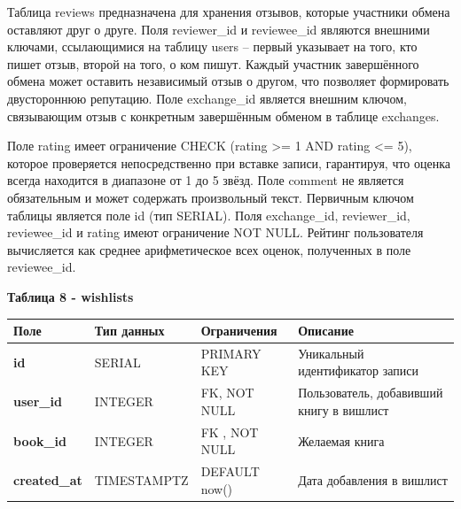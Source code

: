 \documentclass[14pt,a4paper]{extarticle}
\begin{document}
Таблица reviews предназначена для хранения отзывов, которые участники
обмена оставляют друг о друге. Поля reviewer\_id и reviewee\_id являются
внешними ключами, ссылающимися на таблицу users -- первый указывает на
того, кто пишет отзыв, второй на того, о ком пишут. Каждый участник
завершённого обмена может оставить независимый отзыв о другом, что
позволяет формировать двустороннюю репутацию. Поле exchange\_id является
внешним ключом, связывающим отзыв с конкретным завершённым обменом в
таблице exchanges.

Поле rating имеет ограничение CHECK (rating \textgreater= 1 AND rating
\textless= 5), которое проверяется непосредственно при вставке записи,
гарантируя, что оценка всегда находится в диапазоне от 1 до 5 звёзд.
Поле comment не является обязательным и может содержать произвольный
текст. Первичным ключом таблицы является поле id (тип SERIAL). Поля
exchange\_id, reviewer\_id, reviewee\_id и rating имеют ограничение NOT
NULL. Рейтинг пользователя вычисляется как среднее арифметическое всех
оценок, полученных в поле reviewee\_id.

\textbf{Таблица 8 - wishlists}


\begin{longtable}[]{@{}
  >{\centering\arraybackslash}p{}
  >{\centering\arraybackslash}p{}
  >{\centering\arraybackslash}p{}
  >{\centering\arraybackslash}p{}@{}}
\toprule\noalign{}
\begin{minipage}[b]{\linewidth}\centering
\textbf{Поле}
\end{minipage} & \begin{minipage}[b]{\linewidth}\centering
\textbf{Тип данных}
\end{minipage} & \begin{minipage}[b]{\linewidth}\centering
\textbf{Ограничения}
\end{minipage} & \begin{minipage}[b]{\linewidth}\centering
\textbf{Описание}
\end{minipage} \\
\midrule\noalign{}
\endhead
\bottomrule\noalign{}
\endlastfoot
\textbf{id} & SERIAL & PRIMARY KEY & Уникальный идентификатор записи \\
\textbf{user\_id} & INTEGER & FK, NOT NULL & Пользователь, добавивший
книгу в вишлист \\
\textbf{book\_id} & INTEGER & FK , NOT NULL & Желаемая книга \\
\textbf{created\_at} & TIMESTAMPTZ & DEFAULT now() & Дата добавления в
вишлист \\
\end{longtable}
\end{document}

